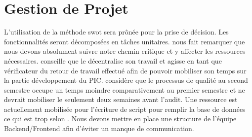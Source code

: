 \documentclass [a4paper] {article}
\begin{document}
\section{Gestion de Projet}
L'utilisation de la méthode swot sera prônée pour la prise de décision. Les fonctionnalités seront décomposées en tâches unitaires.
\nomTuteurPedago{} nous fait remarquer que nous devons absolument suivre notre chemin critique et y affecter les ressources nécessaires.
\nomTuteurPedago{} conseille que le \RQ{} décentralise son travail et agisse en tant que vérificateur du retour de travail effectué afin de pouvoir mobiliser son temps sur la partie développement du PIC.
\nomTuteurPedago{} considère que le processus de qualité au second semestre occupe un temps moindre comparativement au premier semestre et ne devrait mobiliser le \RQ{} seulement deux semaines avant l'audit. Une ressource est actuellement mobilisée pour l'écriture de script pour remplir la base de données ce qui est trop selon \nomTuteurPedago. Nous devons mettre en place une structure de l'équipe Backend/Frontend afin d'éviter un manque de communication.


\newpage
\end{document}
